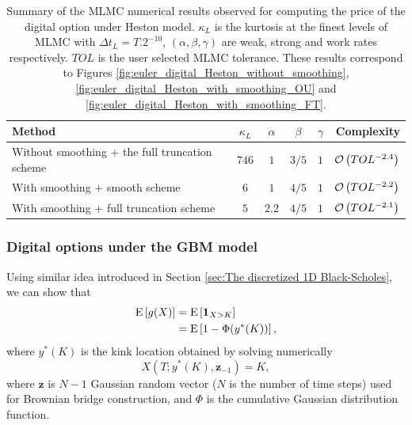\begin{table}[!h]
	\centering
	\begin{small}
	\begin{tabular}{l*{4}{c}r}
	\toprule[1.5pt]
		Method      &     $\kappa_{L}$ & $\alpha$   &  $\beta$  &  $\gamma$   & Complexity \\
		\hline
			Without smoothing $+$ the full truncation scheme  & $746$ & $1$  &  $3/5$&  $1$&  ${\mathcal{O}}\left(TOL^{-2.4}\right)$\\	
              \hline 
            With  smoothing  $+$ smooth scheme & $6$ & $1$  &  $4/5$ & $1$ &  ${\mathcal{O}}\left(TOL^{-2.2}\right)$\\	
               \hline
            With  smoothing $+$ full truncation scheme  & $5$ & $2.2$  &  $4/5$&  $1$ &  ${\mathcal{O}}\left(TOL^{-2.1}\right)$\\	 
		\bottomrule[1.25pt]
	\end{tabular}
\end{small}
	\caption{Summary of the MLMC numerical results observed for  computing the price of the digital option under Heston model. $\kappa_{L}$ is the kurtosis at the finest levels of MLMC with $\Delta t_{L}=T.2^{-10}$, $(\alpha,\beta,\gamma)$ are weak, strong and work rates respectively. $TOL$ is the user selected  MLMC  tolerance.  These results correspond to Figures \ref{fig:euler_digital_Heston_without_smoothing}, \ref{fig:euler_digital_Heston_with_smoothing_OU} and \ref{fig:euler_digital_Heston_with_smoothing_FT}.}
	\label{table:Summary of our numerical results digital Heston.}
\end{table}
\FloatBarrier
\subsubsection{Digital options under the GBM model}\label{sec:Digital options under the GBM model}
Using similar idea introduced in Section \ref{sec:The discretized 1D Black-Scholes}, we can show that
\begin{align}
\mathrm{E}\left[g(X)\right]&=\mathrm{E}\left[\mathbf{1}_{X>K}\right]\nonumber\\
&=\mathrm{E}\left[1-\Phi(y^\ast(K))\right],
\end{align}
where $y^\ast(K)$ is the kink location obtained by solving numerically 
$$X(T; y^\ast(K), \mathbf{z}_{-1})=K,$$
where  $\mathbf{z}$ is $N-1$ Gaussian random  vector ($N$ is the number of time steps) used for Brownian bridge construction, and $\Phi$ is the cumulative Gaussian distribution function.

